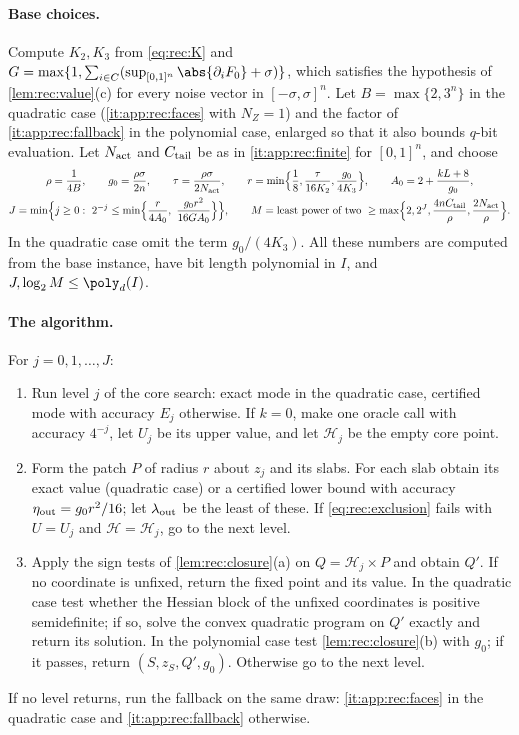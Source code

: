 \paragraph{Base choices.}
Compute $K_2,K_3$ from \eqref{eq:rec:K} and
$G=\max\{1,\sum_{i\in C}(\sup_{[0,1]^n}\abs{\partial_iF_0}+\sigma)\}$, which
satisfies the hypothesis of \cref{lem:rec:value}(c) for every noise vector
in $[-\sigma,\sigma]^n$. Let $B=\max\{2,3^n\}$ in the quadratic case
(\ref{it:app:rec:faces} with $N_Z=1$) and the factor of \ref{it:app:rec:fallback} in the
polynomial case, enlarged so that it also bounds $q$-bit evaluation. Let
$N_{\rm act}$ and $C_{\rm tail}$ be as in \ref{it:app:rec:finite} for
$[0,1]^n$, and choose
\begin{equation}\label{eq:app:rec:params}
\begin{gathered}
 \rho=\frac1{4B},\qquad g_0=\frac{\rho\sigma}{2n},\qquad
 \tau=\frac{\rho\sigma}{2N_{\rm act}},\qquad
 r=\min\Bigl\{\frac18,\frac\tau{16K_2},\frac{g_0}{4K_3}\Bigr\},\qquad
 A_0=2+\frac{kL+8}{g_0},\\
 J=\min\Bigl\{j\ge0:\ 2^{-j}\le\min\Bigl\{\frac r{4A_0},\
 \frac{g_0r^2}{16GA_0}\Bigr\}\Bigr\},\qquad
 M=\text{least power of two}\ \ge\max\Bigl\{2,2^J,\frac{4nC_{\rm tail}}\rho,
 \frac{2N_{\rm act}}\rho\Bigr\}.
\end{gathered}
\end{equation}
In the quadratic case omit the term $g_0/(4K_3)$. All these numbers are
computed from the base instance, have bit length polynomial in $I$, and
$J,\log_2M\le\poly_d(I)$.

\paragraph{The algorithm.}
For $j=0,1,\ldots,J$:
\begin{enumerate}[label=(\arabic*)]
\item Run level $j$ of the core search: exact mode in the quadratic case,
certified mode with accuracy $E_j$ otherwise. If $k=0$, make one oracle call
with accuracy $4^{-j}$, let $U_j$ be its upper value, and let
$\mathcal H_j$ be the empty core point.
\item Form the patch $P$ of radius $r$ about $z_j$ and its slabs. For each
slab obtain its exact value (quadratic case) or a certified lower bound with
accuracy $\eta_{\rm out}=g_0r^2/16$; let $\lambda_{\rm out}$ be the least of
these. If \eqref{eq:rec:exclusion} fails with $U=U_j$ and
$\mathcal H=\mathcal H_j$, go to the next level.
\item Apply the sign tests of \cref{lem:rec:closure}(a) on
$Q=\mathcal H_j\times P$ and obtain $Q'$. If no coordinate is unfixed,
return the fixed point and its value. In the quadratic case test whether
the Hessian block of the unfixed coordinates is positive semidefinite; if so,
solve the convex quadratic program on $Q'$ exactly
\citep{kozlov1980-the-polynomial-solvability-of-convex} and return its solution. In the
polynomial case test \cref{lem:rec:closure}(b) with $g_0$; if it passes,
return $(S,z_S,Q',g_0)$. Otherwise go to the next level.
\end{enumerate}
If no level returns, run the fallback on the same draw:
\ref{it:app:rec:faces} in the quadratic case and \ref{it:app:rec:fallback}
otherwise.

